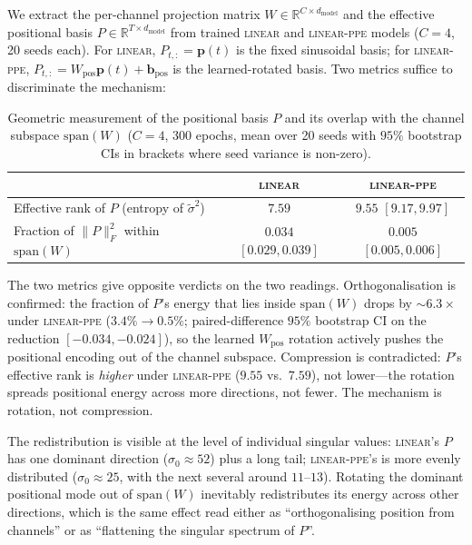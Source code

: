 \documentclass[11pt]{article}
\begin{document}
We extract the per-channel projection matrix $W \in \mathbb{R}^{C
\times d_{\text{model}}}$ and the effective positional basis
$P \in \mathbb{R}^{T \times d_{\text{model}}}$ from trained
\textsc{linear} and \textsc{linear-ppe} models ($C{=}4$, 20 seeds
each). For \textsc{linear}, $P_{t,:} = \mathbf{p}(t)$ is the fixed
sinusoidal basis; for \textsc{linear-ppe}, $P_{t,:} =
W_{\text{pos}} \mathbf{p}(t) + \mathbf{b}_{\text{pos}}$ is the
learned-rotated basis. Two metrics suffice to discriminate the
mechanism:

\begin{table}[h]
\centering
\caption{Geometric measurement of the positional basis $P$ and its
overlap with the channel subspace $\mathrm{span}(W)$
($C{=}4$, $300$ epochs, mean over 20 seeds with $95\%$ bootstrap
CIs in brackets where seed variance is non-zero).}
\label{tab:pospro-geom}
\begin{tabular}{lcc}
\toprule
& \textsc{linear} & \textsc{linear-ppe} \\
\midrule
Effective rank of $P$ (entropy of $\tilde\sigma^2$) & $7.59$ & $9.55$ $[9.17, 9.97]$ \\
Fraction of $\|P\|_F^2$ within $\mathrm{span}(W)$   & $0.034$ $[0.029, 0.039]$ & $0.005$ $[0.005, 0.006]$ \\
\bottomrule
\end{tabular}
\end{table}

The two metrics give opposite verdicts on the two readings.
Orthogonalisation is confirmed: the fraction of $P$'s energy that
lies inside $\mathrm{span}(W)$ drops by $\sim$$6.3\times$ under
\textsc{linear-ppe} ($3.4\% \to 0.5\%$; paired-difference $95\%$
bootstrap CI on the reduction $[-0.034, -0.024]$), so the learned
$W_{\text{pos}}$ rotation actively pushes the positional encoding
out of the channel subspace. Compression is contradicted: $P$'s
effective rank is \emph{higher} under \textsc{linear-ppe} ($9.55$
vs.\ $7.59$), not lower---the rotation spreads positional energy
across more directions, not fewer. The mechanism is rotation, not
compression.

The redistribution is visible at the level of individual singular
values: \textsc{linear}'s $P$ has one dominant direction ($\sigma_0
\approx 52$) plus a long tail; \textsc{linear-ppe}'s is more evenly
distributed ($\sigma_0 \approx 25$, with the next several around
$11$--$13$). Rotating the dominant positional mode out of
$\mathrm{span}(W)$ inevitably redistributes its energy across other
directions, which is the same effect read either as ``orthogonalising
position from channels'' or as ``flattening the singular spectrum of
$P$''.
\end{document}
